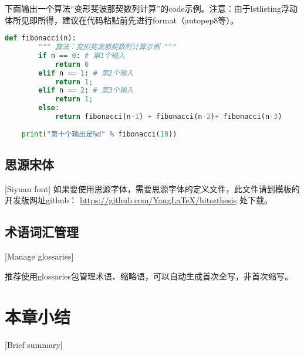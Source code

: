 
下面输出一个算法“变形斐波那契数列计算”的code示例。注意：由于lstlisting浮动体所见即所得，建议在代码粘贴前先进行format（autopep8等）。
\begin{lstlisting}[language=Python]
	def fibonacci(n):
		""" 算法：变形斐波那契数列计算示例 """
		if n == 0: # 第1个输入 
			return 0
		elif n == 1: # 第2个输入 
			return 1;
		elif n == 2: # 第3个输入 
			return 1;
		else:
			return fibonacci(n-1) + fibonacci(n-2)+ fibonacci(n-3)
	
	print("第十个输出是%d" % fibonacci(10))
\end{lstlisting}


\subsection{思源宋体}[Siyuan font]
如果要使用思源字体，需要思源字体的定义文件，此文件请到模板的开发版网址github：
\href{https://github.com/YangLaTeX/hitszthesis}{https://github.com/YangLaTeX/hitszthesis}
处下载。

\subsection{术语词汇管理}[Manage glossaries]

推荐使用glossaries包管理术语、缩略语，可以自动生成首次全写，非首次缩写。

\section{本章小结}[Brief summary]

\lipsum[2]
